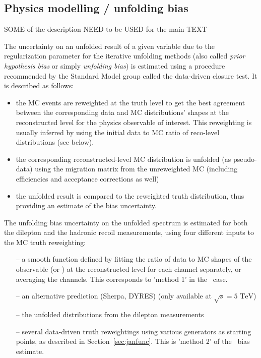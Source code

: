 


\subsection{Physics modelling / unfolding bias}
\label{ss:ZpT_bias}

{\color{blue}  SOME of the description NEED to be USED for the main TEXT }


The uncertainty on an unfolded result of a given variable due to the regularization parameter for the iterative unfolding methods (also called \emph{prior hypothesis bias} or simply \emph{unfolding bias}) is estimated using a procedure recommended by the Standard Model group called the data-driven closure test. It is described as follows:
\begin{itemize}
\item the MC events are reweighted at the truth level to get the best agreement between the corresponding data and MC distributions' shapes at the reconstructed level for the physics observable of interest. This reweighting is usually inferred by using the initial data to MC ratio of reco-level distributions (see below).
\item the corresponding reconstructed-level MC distribution is unfolded (as pseudo-data) using the migration matrix from the unreweighted MC (including efficiencies and acceptance corrections as well)
\item the unfolded result is compared to the reweighted truth distribution, thus providing an estimate of the bias uncertainty.
\end{itemize}

The unfolding bias uncertainty on the unfolded \ptz spectrum is estimated for both the dilepton \pt and the hadronic recoil measurements, using four different inputs to the MC truth reweighting:
\begin{itemize}
\item[--] a smooth function defined by fitting the ratio of data to MC shapes of the observable (\ptdilep or \ut) at the reconstructed level for each channel separately, or averaging the channels. This corresponds to 'method 1' in the \Wboson\ case.
\item[--] an alternative prediction (Sherpa, DYRES) (only available at $\sqrt{s} = 5 \textrm{ TeV}$)
\item[--] the unfolded \ptz distributions from the dilepton \pt measurements
\item[--] several data-driven truth reweightings using various generators as starting points, as described in Section~\ref{sec:janfunc}. This is 'method 2' of the \Wboson\ bias estimate.
\end{itemize}

